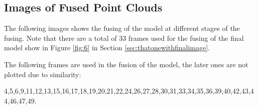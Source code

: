 \documentclass[10pt,a4paper]{article}
\begin{document}
\subsection{Images of Fused Point Clouds}
\label{sec:lotsofimage}

The following images shows the fusing of the model at different stages of the fusing. Note that there are a total of 33 frames used for the fusing of the final model show in Figure \ref{fig:6} in Section \ref{sec:thatonewithfinalimage}.

The following frames are used in the fusion of the model, the later ones are not plotted due to similarity:

 4,5,6,9,11,12,13,15,16,17,18,19,20,21,22,24,26,27,28,30,31,33,34,35,36,39,40,42,43,44,46,47,49.

\vspace{-10pt}
\hspace{-40pt}
\end{document}
